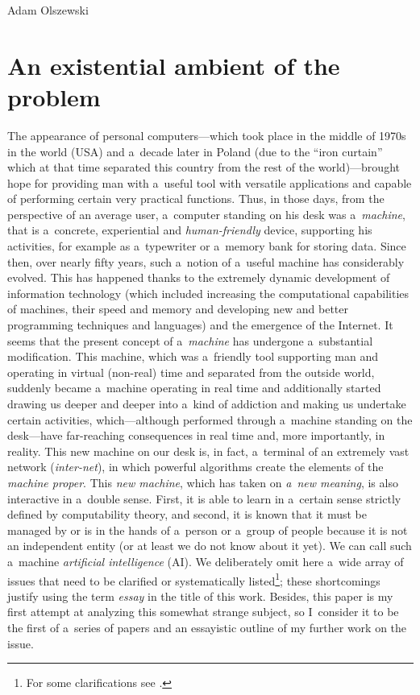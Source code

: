 \begin{artengenv}{Adam Olszewski}
\vspace{-2\baselineskip}

\section{An existential ambient of the problem}
\lettrine[loversize=0.13,lines=2,lraise=-0.03,nindent=0em,findent=0.2pt]%
{T}{}he appearance of personal computers---which took place in the middle of 1970s in the world (USA) and a~decade later in Poland (due to the ``iron curtain'' which at that time separated this country from the rest of the world)---brought hope for providing man with a~useful tool with versatile applications and capable of performing certain very practical functions. Thus, in those days, from the perspective of an average user, a~computer standing on his desk was a~\textit{machine}, that is a~concrete, experiential and \textit{human-friendly} device, supporting his activities, for example as a~typewriter or a~memory bank for storing data. Since then, over nearly fifty years, such a~notion of a~useful machine has considerably evolved. This has happened thanks to the extremely dynamic development of information technology (which included increasing the computational capabilities of machines, their speed and memory and developing new and better programming techniques and languages) and the emergence of the Internet. It seems that the present concept of a~\textit{machine} has undergone a~substantial modification. This machine, which was a~friendly tool supporting man and operating in virtual (non-real) time and separated from the outside world, suddenly became a~machine operating in real time and additionally started drawing us deeper and deeper into a~kind of addiction and making us undertake certain activities, which---although performed through a~machine standing on the desk---have far-reaching consequences in real time and, more importantly, in reality. This new machine on our desk is, in fact, a~terminal of an extremely vast network (\textit{inter-net}), in which powerful algorithms create the elements of the \textit{machine proper}. This \textit{new machine}, which has taken on \textit{a~new meaning}, is also interactive in a~double sense. First, it is able to learn in a~certain sense strictly defined by computability theory, and second, it is known that it must be managed by or is in the hands of a~person or a~group of people because it is not an independent entity (or at least we do not know about it yet). We can call such a~machine \textit{artificial intelligence} (AI). We deliberately omit here a~wide array of issues that need to be clarified or systematically listed\footnote{For some clarifications see
\parencite[][]{krzanowski_meta-ontology_2022}.%
}; these shortcomings justify using the term \textit{essay} in the title of this work. Besides, this paper is my first attempt at analyzing this somewhat strange subject, so I~consider it to be the first of a~series of papers and an essayistic outline of my further work on the issue.


\end{artengenv}
